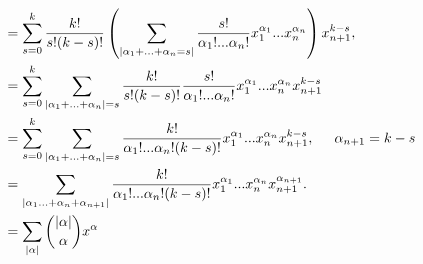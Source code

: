 \begin{homeworkProblem}
\begin{solucion}
\begin{align*}
                                        & = \displaystyle \sum_{s=0}^{k}\dfrac{k!}{s!(k-s)!} \left( \displaystyle \sum_{\abs{\alpha_{1} + ... +\alpha_{n} = s}} \dfrac{s!}{\alpha_{1}!...\alpha_{n}!}x_{1}^{\alpha_{1}}...x_{n}^{\alpha_{n}} \right)x_{n+1}^{k-s} ,\\ 
                                         & = \displaystyle\sum_{s=0}^{k} \displaystyle \sum_{\abs{\alpha_{1} + ... +\alpha_{n} } = s} \dfrac{k!}{s!(k-s)!} \dfrac{s!}{\alpha_{1}!...\alpha_{n}!}x_{1}^{\alpha_{1}}...x_{n}^{\alpha_{n}}x_{n+1}^{k-s}\\
                                         & = \displaystyle\sum_{s=0}^{k} \displaystyle \sum_{\abs{\alpha_{1} + ... +\alpha_{n} } = s} \dfrac{k!}{\alpha_{1}!...\alpha_{n}!(k-s)!}x_{1}^{\alpha_{1}}...x_{n}^{\alpha_{n}}x_{n+1}^{k-s}, \hspace{0,5cm}  \alpha_{n+1} = k-s\\
                                         &=\displaystyle \sum_{\abs{\alpha_{1}...+\alpha_{n}+\alpha_{n+1}}} \dfrac{k!}{\alpha_{1}!...\alpha_{n}!(k-s)!}x_{1}^{\alpha_{1}}...x_{n}^{\alpha_{n}}x_{n+1}^{\alpha_{n+1}}.\\
                                         &= \displaystyle \sum_{\abs{\alpha}} \binom{\abs{\alpha}}{\alpha}x^{\alpha}
        \end{align*}
        \demostrado
    \end{solucion}
\end{homeworkProblem}
\newpage

